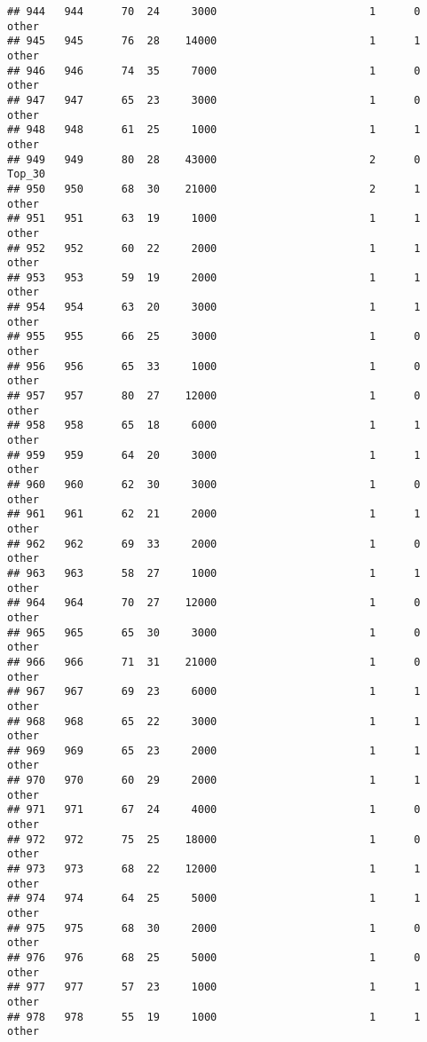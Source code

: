 \documentclass[
]{article}
\begin{document}
\begin{verbatim}
## 944   944      70  24     3000                        1      0    other
## 945   945      76  28    14000                        1      1    other
## 946   946      74  35     7000                        1      0    other
## 947   947      65  23     3000                        1      0    other
## 948   948      61  25     1000                        1      1    other
## 949   949      80  28    43000                        2      0   Top_30
## 950   950      68  30    21000                        2      1    other
## 951   951      63  19     1000                        1      1    other
## 952   952      60  22     2000                        1      1    other
## 953   953      59  19     2000                        1      1    other
## 954   954      63  20     3000                        1      1    other
## 955   955      66  25     3000                        1      0    other
## 956   956      65  33     1000                        1      0    other
## 957   957      80  27    12000                        1      0    other
## 958   958      65  18     6000                        1      1    other
## 959   959      64  20     3000                        1      1    other
## 960   960      62  30     3000                        1      0    other
## 961   961      62  21     2000                        1      1    other
## 962   962      69  33     2000                        1      0    other
## 963   963      58  27     1000                        1      1    other
## 964   964      70  27    12000                        1      0    other
## 965   965      65  30     3000                        1      0    other
## 966   966      71  31    21000                        1      0    other
## 967   967      69  23     6000                        1      1    other
## 968   968      65  22     3000                        1      1    other
## 969   969      65  23     2000                        1      1    other
## 970   970      60  29     2000                        1      1    other
## 971   971      67  24     4000                        1      0    other
## 972   972      75  25    18000                        1      0    other
## 973   973      68  22    12000                        1      1    other
## 974   974      64  25     5000                        1      1    other
## 975   975      68  30     2000                        1      0    other
## 976   976      68  25     5000                        1      0    other
## 977   977      57  23     1000                        1      1    other
## 978   978      55  19     1000                        1      1    other

\end{verbatim}
\end{document}

